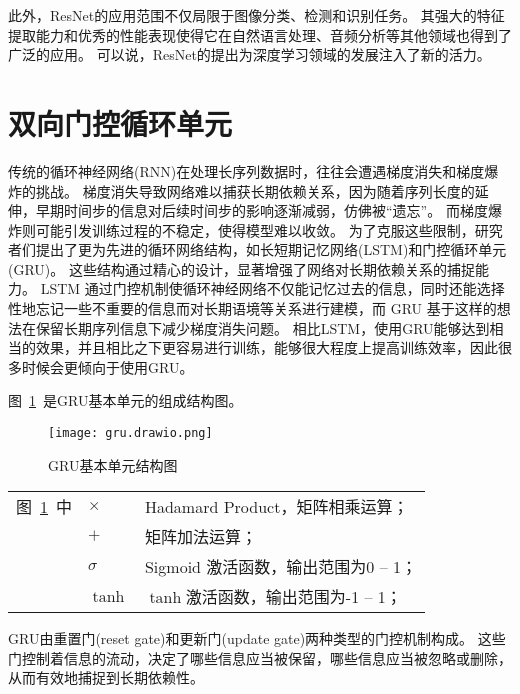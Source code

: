 此外，ResNet的应用范围不仅局限于图像分类、检测和识别任务。
其强大的特征提取能力和优秀的性能表现使得它在自然语言处理、音频分析等其他领域也得到了广泛的应用。
可以说，ResNet的提出为深度学习领域的发展注入了新的活力。


\section{双向门控循环单元}
传统的循环神经网络(RNN)在处理长序列数据时，往往会遭遇梯度消失和梯度爆炸的挑战。
梯度消失导致网络难以捕获长期依赖关系，因为随着序列长度的延伸，早期时间步的信息对后续时间步的影响逐渐减弱，仿佛被“遗忘”。
而梯度爆炸则可能引发训练过程的不稳定，使得模型难以收敛。
为了克服这些限制，研究者们提出了更为先进的循环网络结构，如长短期记忆网络(LSTM)\cite{2023Comparative}和门控循环单元(GRU)\cite{2023Short}。
这些结构通过精心的设计，显著增强了网络对长期依赖关系的捕捉能力。
LSTM 通过门控机制使循环神经网络不仅能记忆过去的信息，同时还能选择性地忘记一些不重要的信息而对长期语境等关系进行建模，而 GRU 基于这样的想法在保留长期序列信息下减少梯度消失问题。
相比LSTM，使用GRU能够达到相当的效果，并且相比之下更容易进行训练，能够很大程度上提高训练效率，因此很多时候会更倾向于使用GRU。

图~\ref{fig:GRUunit}~是GRU基本单元的组成结构图。
\begin{figure}[h] 
  \centering
  \texttt{[image: gru.drawio.png]}
  \caption{GRU基本单元结构图}
  \label{fig:GRUunit}
\end{figure}
\begin{flushleft}
  \renewcommand\arraystretch{1.25}
  \begin{tabularx}{\textwidth}{@{}>{\normalsize\rm}l@{\quad}>{\normalsize\rm}l@{——}>{\normalsize\rm}X@{}}
  图~\ref{fig:GRUunit}~中
  &  $\times$ &Hadamard Product，矩阵相乘运算；\\
  &  $+$ &矩阵加法运算；\\
  &  $σ$ &Sigmoid 激活函数，输出范围为0 -- 1；\\
  &  $\tanh$ & $\tanh$激活函数，输出范围为-1 -- 1；\\
  \end{tabularx}\vspace{.5ex}%
\end{flushleft}

GRU由重置门(reset gate)和更新门(update gate)两种类型的门控机制构成。
这些门控制着信息的流动，决定了哪些信息应当被保留，哪些信息应当被忽略或删除，从而有效地捕捉到长期依赖性。

